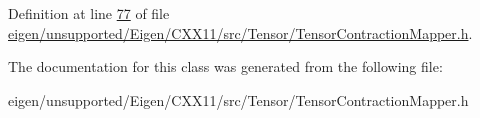 Definition at line \hyperlink{eigen_2unsupported_2_eigen_2_c_x_x11_2src_2_tensor_2_tensor_contraction_mapper_8h_source_l00077}{77} of file \hyperlink{eigen_2unsupported_2_eigen_2_c_x_x11_2src_2_tensor_2_tensor_contraction_mapper_8h_source}{eigen/unsupported/\+Eigen/\+C\+X\+X11/src/\+Tensor/\+Tensor\+Contraction\+Mapper.\+h}.



The documentation for this class was generated from the following file\+:\begin{DoxyCompactItemize}
\item 
eigen/unsupported/\+Eigen/\+C\+X\+X11/src/\+Tensor/\+Tensor\+Contraction\+Mapper.\+h\end{DoxyCompactItemize}
